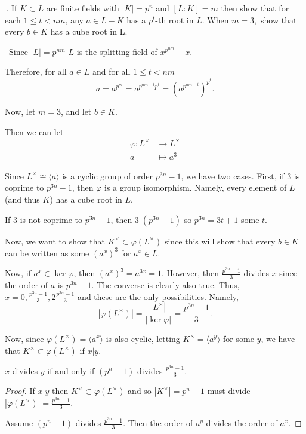 \documentclass[12pt]{AlgebraQual}
\begin{document}
\begin{problem} $\,$.
If $K\subset L$ are finite fields with $|K|=p^n$ and $[L:K]=m$ then show that for each $1\le t<nm$, any $a\in L-K$ has a $p^t$-th root in $L$. When $m=3,$ show that every $b\in K$ has a cube root in L.
\end{problem}


\begin{solution}$\,$
Since $|L|=p^{nm}$ $L$ is the splitting field of $x^{p^{nm}}-x.$

Therefore, for all $a\in L$ and for all $1\le t<nm$ $$a=a^{p^m}=a^{p^{nm-t}p^t}=\left(a^{p^{nm-t}}\right)^{p^t}.$$

Now, let $m=3$, and let $b\in K$.

Then we can let \begin{align*}
    \varphi:L^\times&\to L^\times\\
    a&\mapsto a^3
\end{align*}

Since $L^\times\cong\langle a\rangle$ is a cyclic group of order $p^{3n}-1$, we have two cases. First, if $3$ is coprime to $p^{3n}-1$, then $\varphi$ is a group isomorphism. Namely, every element of $L$ (and thus $K$) has a cube root in $L$.

If $3$ is not coprime to $p^{3n}-1$, then $3|(p^{3n}-1)$ so $p^{3n}=3t+1$ some $t.$

Now, we want to show that $K^\times\subset\varphi(L^\times)$ since this will show that every $b\in K$ can be written as some $(a^x)^3$ for $a^x\in L.$

Now, if $a^x\in\ker\varphi$, then $(a^x)^3=a^{3x}=1$. However, then $\frac{p^{3n}-1}{3}$ divides $x$ since the order of $a$ is $p^{3n}-1$. The converse is clearly also true. Thus, $x=0,\frac{p^{3n}-1}{3},2\frac{p^{3n}-1}{3}$ and these are the only possibilities. Namely, $$|\varphi(L^\times)|=\frac{|L^\times|}{|\ker\varphi|}=\frac{p^{3n}-1}{3}.$$

Now, since $\varphi(L^\times)=\langle a^x\rangle$ is also cyclic, letting $K^\times=\langle a^y\rangle$ for some $y$, we have that $K^\times\subset\varphi(L^\times)$ if $x|y$.

\begin{claim} $x$ divides $y$ if and only if $(p^n-1)$ divides $\frac{p^{3n}-1}{3}$.
\begin{proof} \boxed{\implies} If $x|y$ then $K^\times\subset\varphi(L^\times)$ and so $|K^\times|=p^n-1$ must divide $|\varphi(L^\times)|=\frac{p^{3n}-1}{3}$.

\boxed{\impliedby} Assume $(p^n-1)$ divides $\frac{p^{3n}-1}{3}$. Then the order of $a^y$ divides the order of $a^x$.


\end{proof}
\end{claim}
\end{solution}
\end{document}
